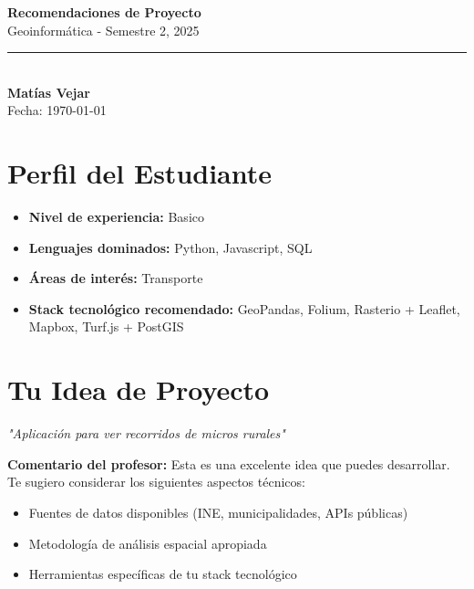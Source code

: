 \documentclass[11pt,a4paper]{article}
\begin{document}
\begin{center}
    {\Huge \textbf{Recomendaciones de Proyecto}}\\[0.5cm]
    {\Large \textcolor{usachblue}{Geoinformática - Semestre 2, 2025}}\\[0.3cm]
    \rule{\textwidth}{0.5pt}\\[0.3cm]
    {\LARGE \textbf{Matías Vejar}}\\[0.2cm]
    {\large Fecha: \today}
\end{center}

\vspace{0.5cm}

\section*{ Perfil del Estudiante}

\begin{tcolorbox}[colback=blue!5,colframe=usachblue,title=Resumen de tu Perfil]
\begin{itemize}[leftmargin=*]
    \item \textbf{Nivel de experiencia:} Basico
    \item \textbf{Lenguajes dominados:} Python, Javascript, SQL
    \item \textbf{Áreas de interés:} Transporte
    \item \textbf{Stack tecnológico recomendado:} GeoPandas, Folium, Rasterio + Leaflet, Mapbox, Turf.js + PostGIS
\end{itemize}
\end{tcolorbox}


\section*{ Tu Idea de Proyecto}

\begin{tcolorbox}[colback=yellow!10,colframe=darkorange,title=Idea Original]
\textit{"Aplicación para ver recorridos de micros rurales"}

\vspace{0.3cm}
\textbf{Comentario del profesor:} Esta es una excelente idea que puedes desarrollar. Te sugiero considerar los siguientes aspectos técnicos:
\begin{itemize}
    \item Fuentes de datos disponibles (INE, municipalidades, APIs públicas)
    \item Metodología de análisis espacial apropiada
    \item Herramientas específicas de tu stack tecnológico
\end{itemize}
\end{tcolorbox}
\end{document}
